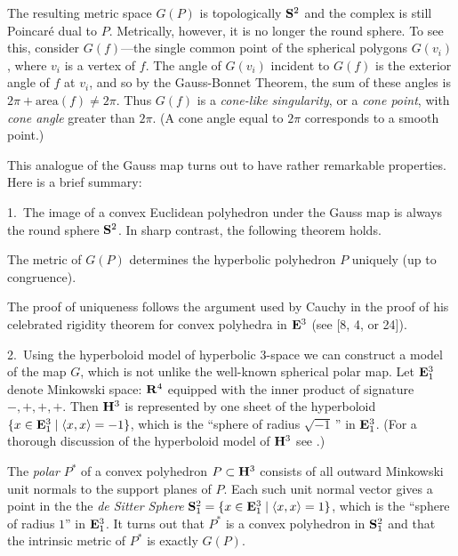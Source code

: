 The resulting metric space
$G(P)$ is topologically $\bold{S}^2$ and the complex
is still Poincar\'e dual to $P$. Metrically, however, it 
is no longer
the round sphere. To see this, consider $G(f)$---the 
single common
point of the spherical polygons $G(v_i)$, where $v_i$ is a 
vertex of $f$. 
The angle of $G(v_i)$ incident to $G(f)$ is the exterior 
angle of $f$ at 
$v_i$, and so by the Gauss-Bonnet Theorem, the sum of 
these angles is 
$2\pi+\mathrm{area}(f) \neq 2\pi$. Thus
$G(f)$ is a {\em cone-like singularity\/}, or a {\em cone 
point\/}, with
{\em cone angle\/} greater than $2\pi$. (A cone angle 
equal to $2\pi$
corresponds to a smooth point.)

This analogue of the Gauss map turns out to have rather
remarkable properties. Here is a brief summary:

1.\ The image of a convex Euclidean polyhedron under the 
Gauss
map is always the round sphere $\bold{S}^2$. In sharp contrast, 
the following
theorem holds.
\begin{Theorem}
The metric of
$G(P)$ determines the hyperbolic polyhedron $P$ uniquely 
\RM(up to
congruence\/\RM).
\end{Theorem}

The proof of uniqueness follows the argument used by 
Cauchy in
the proof of his celebrated rigidity theorem for convex 
polyhedra in
$\bold{E}^3$ (see [8, 4, or 24]).

2.\ Using the hyperboloid model of hyperbolic 3-space we 
can construct a
model of the map $G$, which is not unlike the well-known 
spherical
polar map. Let $\bold{E}^3_1$ denote Minkowski space: $\bold{R}^4$ 
equipped with the inner
product of signature $-, +, +, +$. Then $\bold{H}^3$ is 
represented by one
sheet of the hyperboloid $\{x \in \bold{E}^3_1 \mid \langle x, x 
\rangle = -1\}$, which is the ``sphere of radius 
$\sqrt{-1}\,$'' in $\bold{E}^3_1$.
(For a thorough discussion of the hyperboloid model of 
$\bold{H}^3$ see
\cite{th:gt3m, bear:grps}.) 

The {\em polar} $P^*$ of a convex polyhedron $P \subset 
\bold{H}^3$ consists of
all outward Minkowski unit normals to the support planes 
of $P$.
Each such unit normal vector gives a point in the 
the {\em de Sitter Sphere} $\bold{S}_1^2= \{x \in \bold{E}^3_1 \mid 
\langle x, x
\rangle = 1\}$, which is the ``sphere of radius $1$'' in 
$\bold{E}^3_1$.
It turns out that $P^*$ is a convex polyhedron in 
$\bold{S}_1^2$ and that the
intrinsic metric of $P^*$ is exactly $G(P)$.

